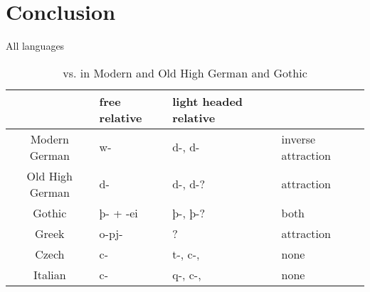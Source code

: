 \section{Conclusion}

All languages

\begin{table}[h]\label{tbl:morph}
	\center
	\caption { vs.  in Modern and Old High German and Gothic}
	\begin{minipage}{\linewidth}
		\begin{tabularx}{\textwidth}{c *{3}{Y}}
		\toprule
		 								& free relative	& light headed relative &	\\
		\midrule
		Modern German 	& w-			 				&	d-, d-							&	inverse attraction	\\
		Old High German	& d-							&	d-, d-?							&	attraction					\\
		Gothic					&	þ- + -ei				&	þ-, þ-?							&	both								\\
		Greek						& o-pj-						&	?										&	attraction					\\
		Czech						& c-							&	t-, c-,							& none								\\
		Italian					& c-							& q-, c-,							& none								\\
		\bottomrule
		\end{tabularx}
	\end{minipage}
\end{table}
